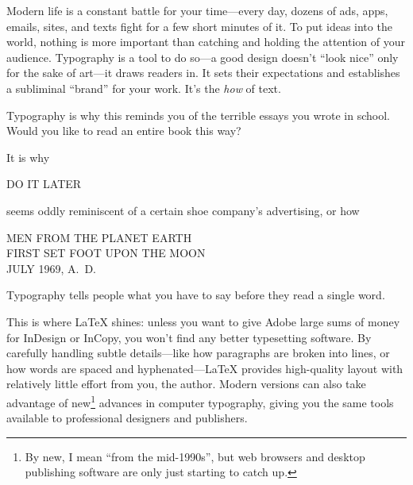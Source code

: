 Modern life is a constant battle for your time---every day,
dozens of ads, apps, emails, sites, and texts fight
for a few short minutes of it.
To put ideas into the world,
nothing is more important than catching and holding
the attention of your audience.
Typography is a tool to do so---a good design doesn't ``look nice''
only for the sake of art---it draws readers in.\punckern{}
It sets their expectations and establishes a subliminal ``brand'' for your
work.\punckern{}
It's the \emph{how} of text.
\begin{leftfigure}
\fontsize{12pt}{24pt}\selectfont\raggedright
Typography is why this reminds you of the terrible essays
you wrote in school.
Would you like to read an entire book this way?
\end{leftfigure}
It is why
\begin{leftfigure}
\noindent{}\Large DO IT LATER
\end{leftfigure}
seems oddly reminiscent of a certain shoe company's advertising,
or how
\begin{center}
\noindent MEN FROM THE PLANET EARTH \\
FIRST SET FOOT UPON THE MOON \\
JULY 1969, A.~D.
\end{center}
Typography tells people
what you have to say before they read a single word.

This is where \LaTeX{} shines: unless you want to give Adobe large sums
of money for InDesign or InCopy,
you won't find any better typesetting software.
By carefully handling subtle details---like how paragraphs are broken into lines,
or how words are spaced and hyphenated---\LaTeX{} provides high-quality layout
with relatively little effort from you, the author.
Modern versions can also take advantage of new\footnote{By new,
I mean ``from the mid-1990s''\quotekern, but web browsers and desktop publishing
software are only just starting to catch up.} advances in computer typography,
giving you the same tools available to professional designers and publishers.


